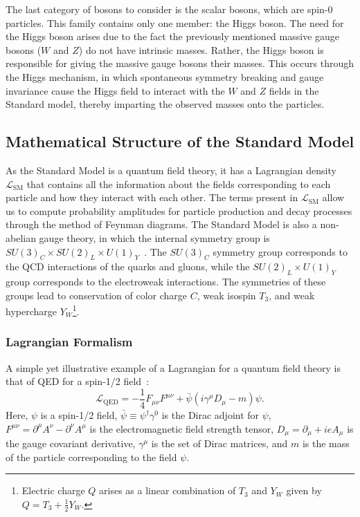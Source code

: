 The last category of bosons to consider is the scalar bosons, which are spin-0 particles.
This family contains only one member: the Higgs boson.
The need for the Higgs boson arises due to the fact the previously mentioned massive gauge bosons ($W$ and $Z$) do not have intrinsic masses.
Rather, the Higgs boson is responsible for giving the massive gauge bosons their masses.
This occurs through the Higgs mechanism, in which spontaneous symmetry breaking and gauge invariance cause the Higgs field to interact with the $W$ and $Z$ fields in the Standard model, thereby imparting the observed masses onto the particles.

\subsection{Mathematical Structure of the Standard Model}

As the Standard Model is a quantum field theory, it has a Lagrangian density $\mathcal{L}_\mathrm{SM}$ that contains all the information about the fields corresponding to each particle and how they interact with each other.
The terms present in $\mathcal{L}_\mathrm{SM}$ allow us to compute probability amplitudes for particle production and decay processes through the method of Feynman diagrams.
The Standard Model is also a non-abelian gauge theory, in which the internal symmetry group is $SU(3)_C\times SU(2)_L\times U(1)_Y$~\cite{Srednicki:1019751}.
The $SU(3)_C$ symmetry group corresponds to the QCD interactions of the quarks and gluons, while the $SU(2)_L\times U(1)_Y$ group corresponds to the electroweak interactions.
The symmetries of these groups lead to conservation of color charge $C$, weak isospin $T_3$, and weak hypercharge $Y_W$\footnote{Electric charge $Q$ arises as a linear combination of $T_3$ and $Y_W$ given by $Q=T_3+\frac{1}{2}Y_W$.}.

\subsubsection{Lagrangian Formalism}

A simple yet illustrative example of a Lagrangian for a quantum field theory is that of QED for a spin-1/2 field~\cite{Klauber:2013ipa}:
\begin{equation}\label{eq:QED}
  \mathcal{L}_\mathrm{QED}=-\frac{1}{4}F_{\mu\nu}F^{\mu\nu}+\bar{\psi}(i\gamma^\mu D_\mu-m)\psi.
\end{equation}
Here, $\psi$ is a spin-1/2 field, $\bar{\psi}\equiv\psi^\dagger\gamma^0$ is the Dirac adjoint for $\psi$, $F^{\mu\nu}=\partial^\mu A^\nu-\partial^\nu A^\mu$ is the electromagnetic field strength tensor, $D_\mu=\partial_\mu+ieA_\mu$ is the gauge covariant derivative, $\gamma^\mu$ is the set of Dirac matrices, and $m$ is the mass of the particle corresponding to the field $\psi$.

